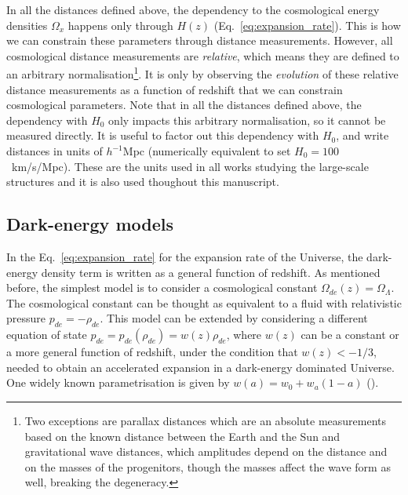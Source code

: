     In all the distances defined above, the dependency to the cosmological energy densities
    $\Omega_x$ happens only through $H(z)$ (Eq.~\ref{eq:expansion_rate}). This is how we can 
    constrain these parameters through distance measurements. However, all cosmological 
    distance measurements are \emph{relative}, which means they are defined to an arbitrary 
    normalisation\footnote{Two exceptions are parallax distances which are an absolute measurements
    based on the known distance between the Earth and the Sun and gravitational wave distances,
    which amplitudes depend on the distance and on the masses of the progenitors, though
    the masses affect the wave form as well, breaking the degeneracy.}. 
    It is only by observing the \emph{evolution} 
    of these relative distance measurements as a function of redshift 
    that we can constrain cosmological parameters.
    Note that in all the distances defined above, the dependency with $H_0$ only impacts
    this arbitrary normalisation, so it cannot be measured directly. 
    It is useful to factor out this dependency with $H_0$, and write distances 
    in units of $h^{-1}$Mpc (numerically equivalent to set $H_0 = 100$~km/s/Mpc). 
    These are the units used in all works studying the large-scale structures and it is 
    also used thoughout this manuscript. 
    
    \subsection{Dark-energy models}
    \label{intro:model:dark_energy_models}

    In the Eq.~\ref{eq:expansion_rate} for the expansion rate of the Universe, 
    the dark-energy density term is written as a general function of redshift.
    As mentioned before, the simplest model is to consider a cosmological constant
    $\Omega_{de}(z) = \Omega_\Lambda$.  
    The cosmological constant can be thought as equivalent to a fluid with 
    relativistic pressure $p_{de} = -\rho_{de}$. This model can be extended by 
    considering a different equation of state $p_{de} = p_{de}(\rho_{de}) = w(z) \rho_{de}$, 
    where $w(z)$ can be a constant or a more general function of redshift, under the
    condition that $w(z) < -1/3$, needed to obtain an accelerated expansion in a dark-energy 
    dominated Universe. One widely known parametrisation is given by $w(a) = w_0 + w_a(1-a)$ 
    (\cite{chevallierAcceleratingUniversesScaling2001, linderExploringExpansionHistory2003}). 
    

